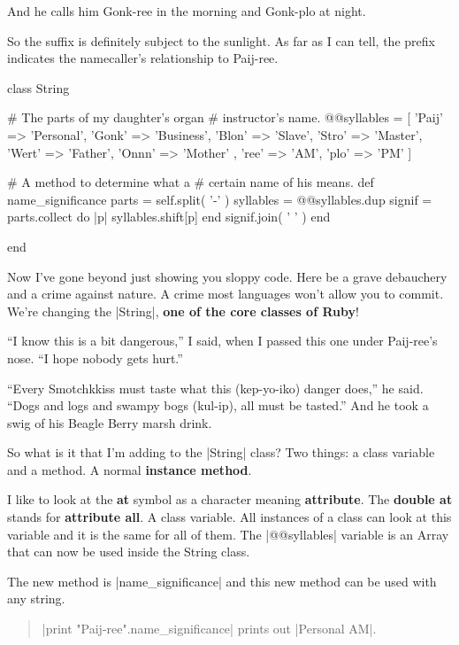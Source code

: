 \documentclass[12pt,twoside]{report}
\begin{document}
And he calls him Gonk-ree in the morning and Gonk-plo at night.

So the suffix is definitely subject to the sunlight.  As far as I can
tell, the prefix indicates the namecaller's relationship to Paij-ree.


\begin{rubycode}

 class String

   # The parts of my daughter's organ
   # instructor's name.
   @@syllables = [
     { 'Paij' => 'Personal',
       'Gonk' => 'Business',
       'Blon' => 'Slave',
       'Stro' => 'Master',
       'Wert' => 'Father',
       'Onnn' => 'Mother' },
     { 'ree'  => 'AM',
       'plo'  => 'PM' }
   ]

   # A method to determine what a
   # certain name of his means.
   def name_significance
     parts = self.split( '-' )
     syllables = @@syllables.dup
     signif = parts.collect do |p|
       syllables.shift[p]
     end
     signif.join( ' ' )
   end

 end

\end{rubycode}


Now I've gone beyond just showing you sloppy code.  Here be a grave
debauchery and a crime against nature.  A crime most languages won't
allow you to commit.  We're changing the
\rubyinline|String|, {\bf one of the core classes of
  Ruby}!

``I know this is a bit dangerous,'' I said, when I passed this one
under Paij-ree's nose. ``I hope nobody gets hurt.''

``Every Smotchkkiss must taste what this (kep-yo-iko) danger does,''
he said.  ``Dogs and logs and swampy bogs (kul-ip), all must be
tasted.''  And he took a swig of his Beagle Berry marsh drink.

So what is it that I'm adding to the
\rubyinline|String| class?  Two things: a class
variable and a method.  A normal {\bf instance method}.

I like to look at the {\bf at} symbol as a character meaning {\bf
  attribute}.  The {\bf double at} stands for {\bf attribute all}.  A
class variable.  All instances of a class can look at this variable
and it is the same for all of them.  The
\rubyinline|@@syllables| variable is an Array that can
now be used inside the String class.

The new method is \rubyinline|name_significance| and
this new method can be used with any string.

\begin{quote}
\rubyinline|print "Paij-ree".name_significance| prints
out \rubyinline|Personal AM|.\end{quote}
\end{document}
